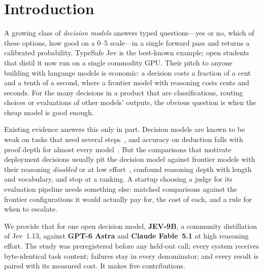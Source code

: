 \section{Introduction}
\label{sec:intro}

A growing class of \emph{decision models} answers typed questions---yes or no, which of these options, how good on a 0--5 scale---in a single forward pass and returns a calibrated probability.
TypeSafe Jev is the best-known example; open students that distil it now run on a single commodity GPU.
Their pitch to anyone building with language models is economic: a decision costs a fraction of a cent and a tenth of a second, where a frontier model with reasoning costs cents and seconds.
For the many decisions in a product that are classifications, routing choices or evaluations of other models' outputs, the obvious question is when the cheap model is good enough.

Existing evidence answers this only in part.
Decision models are known to be weak on tasks that need several steps~\citep{jevbench2026,jevjudge2026,gdm2026}, and accuracy on deduction falls with proof depth for almost every model~\citep{proofwriter2021,prontoqa2023,qmfol2026,harddecisions2026}.
But the comparisons that motivate deployment decisions usually pit the decision model against frontier models with their reasoning \emph{disabled} or at low effort~\citep{jevjudge2026,harddecisions2026}, confound reasoning depth with length and vocabulary, and stop at a ranking.
A startup choosing a judge for its evaluation pipeline needs something else: matched comparisons against the frontier configurations it would actually pay for, the cost of each, and a rule for when to escalate.

We provide that for one open decision model, \textbf{JEV-9B}, a community distillation of Jev~1.13, against \textbf{GPT-6 Astra} and \textbf{Claude Fable~5.1} at high reasoning effort.
The study was preregistered before any held-out call; every system receives byte-identical task content; failures stay in every denominator; and every result is paired with its measured cost.
It makes five contributions.

